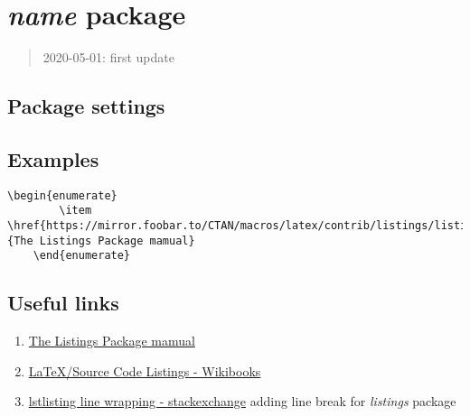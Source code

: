 \section{\textit{name} package}

\begin{quote}
    2020-05-01: first update
\end{quote}

\subsection{Package settings}

\subsection{Examples}

\begin{lstlisting}[language=Tex]
    \begin{enumerate}
        \item \href{https://mirror.foobar.to/CTAN/macros/latex/contrib/listings/listings.pdf}{The Listings Package mamual}
    \end{enumerate}
\end{lstlisting}


\subsection{Useful links}

\begin{enumerate}

    \item \href{https://mirror.foobar.to/CTAN/macros/latex/contrib/listings/listings.pdf}{The Listings Package mamual}
    \item \href{https://en.wikibooks.org/wiki/LaTeX/Source_Code_Listings}{LaTeX/Source Code Listings - Wikibooks}
    \item \href{https://tex.stackexchange.com/questions/116534/lstlisting-line-wrapping/116572}{lstlisting line wrapping - stackexchange}
        adding line break for \textit{listings} package
    
\end{enumerate}

